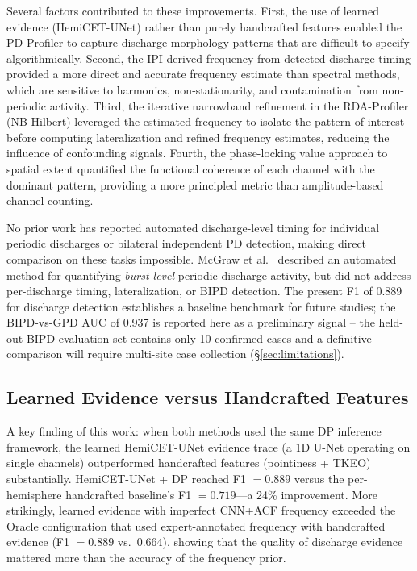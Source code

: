 \documentclass{iopjournal}
\begin{document}
Several factors contributed to these improvements. First, the use of learned evidence (HemiCET-UNet) rather than purely handcrafted features enabled the PD-Profiler to capture discharge morphology patterns that are difficult to specify algorithmically. Second, the IPI-derived frequency from detected discharge timing provided a more direct and accurate frequency estimate than spectral methods, which are sensitive to harmonics, non-stationarity, and contamination from non-periodic activity. Third, the iterative narrowband refinement in the RDA-Profiler (NB-Hilbert) leveraged the estimated frequency to isolate the pattern of interest before computing lateralization and refined frequency estimates, reducing the influence of confounding signals. Fourth, the phase-locking value approach to spatial extent quantified the functional coherence of each channel with the dominant pattern, providing a more principled metric than amplitude-based channel counting.

No prior work has reported automated discharge-level timing for individual periodic discharges or bilateral independent PD detection, making direct comparison on these tasks impossible. McGraw et al.~\cite{mcgraw2024} described an automated method for quantifying \emph{burst-level} periodic discharge activity, but did not address per-discharge timing, lateralization, or BIPD detection. The present F1 of 0.889 for discharge detection establishes a baseline benchmark for future studies; the BIPD-vs-GPD AUC of 0.937 is reported here as a preliminary signal -- the held-out BIPD evaluation set contains only 10 confirmed cases and a definitive comparison will require multi-site case collection (\S\ref{sec:limitations}).

\subsection{Learned Evidence versus Handcrafted Features}
\label{sec:learned_vs_handcrafted}

A key finding of this work: when both methods used the same DP inference framework, the learned HemiCET-UNet evidence trace (a 1D U-Net operating on single channels) outperformed handcrafted features (pointiness + TKEO) substantially. HemiCET-UNet + DP reached F1 $= 0.889$ versus the per-hemisphere handcrafted baseline's F1 $= 0.719$---a 24\% improvement. More strikingly, learned evidence with imperfect CNN+ACF frequency exceeded the Oracle configuration that used expert-annotated frequency with handcrafted evidence (F1 $= 0.889$ vs.\ $0.664$), showing that the quality of discharge evidence mattered more than the accuracy of the frequency prior.
\end{document}
